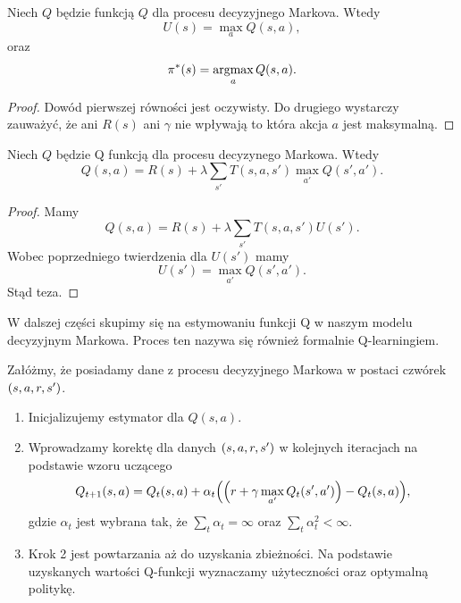 \documentclass[10pt,a4paper]{book}
\newcommand{\argmax}{\operatornamewithlimits{argmax}}
\begin{document}
\begin{theorem}
Niech $Q$ będzie funkcją $Q$ dla procesu decyzyjnego Markova. Wtedy
$$
U(s) = \max_{a} Q(s,a),
$$
oraz 
$$
\pi^\ast(s) = \argmax_{a} Q(s,a).
$$
\end{theorem}

\begin{proof}
Dowód pierwszej równości jest oczywisty. Do drugiego wystarczy zauważyć, że ani $R(s)$ ani $\gamma$ nie wpływają to która akcja $a$ jest maksymalną.
\end{proof}

\begin{theorem}
Niech $Q$ będzie Q funkcją dla procesu decyzynego Markowa. Wtedy 
$$
Q(s,a) = R(s) + \lambda \sum_{s'} T(s,a,s') \max_{a'} Q(s',a').
$$
\end{theorem}

\begin{proof}
Mamy 
$$
Q(s,a) = R(s) + \lambda \sum_{s'} T(s,a,s') U(s').
$$
Wobec poprzedniego twierdzenia dla $U(s')$ mamy
$$
U(s') = \max_{a'} Q(s',a').
$$
Stąd teza.

\end{proof}

W dalszej części skupimy się na estymowaniu funkcji Q w naszym modelu decyzyjnym Markowa. Proces ten nazywa się również formalnie Q-learningiem.

\begin{definition}
Załóżmy, że posiadamy dane z procesu decyzyjnego Markowa w postaci czwórek $\left( {s,a,r,s'} \right)$. 
\begin{enumerate}
\item Inicjalizujemy estymator dla $Q(s,a)$. 
\item Wprowadzamy korektę dla danych $\left( {s,a,r,s'} \right)$ w kolejnych iteracjach na podstawie wzoru uczącego
$$
Q_{t+1}(s,a) = Q_{t}(s,a) + \alpha_t {\left( { {\left( {r + \gamma \max_{a'} Q_{t}(s',a')} \right)} - Q_{t}(s,a)} \right)},
$$
gdzie $\alpha_t$ jest wybrana tak, że $\sum_{t} \alpha_t = \infty$ oraz $\sum_{t} \alpha_t^2 < \infty$.
\item Krok 2 jest powtarzania aż do uzyskania zbieżności. Na podstawie uzyskanych wartości Q-funkcji wyznaczamy użyteczności oraz optymalną politykę.
\end{enumerate}

\end{definition}

\printindex



\end{document}
